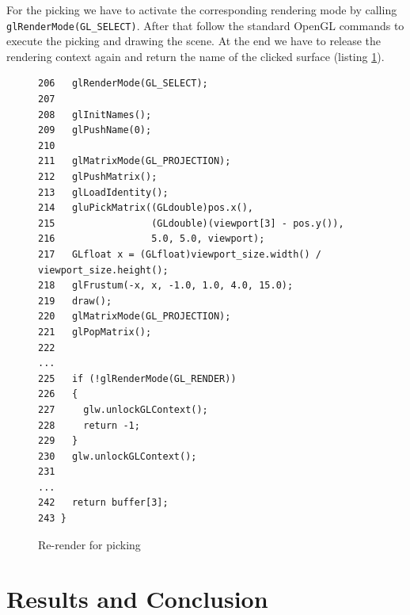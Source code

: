 \documentclass[jou,noapacite]{apa}
\renewcommand{\figurename}{Listing}
\begin{document}
For the picking we have to activate the corresponding rendering mode by
calling \lstinline|glRenderMode(GL_SELECT)|.
%
After that follow the standard OpenGL commands to execute the picking and
drawing the scene.
%
At the end we have to release the rendering context again and return the name
of the clicked surface (listing \ref{lst:picking}).
%
\begin{figure}[h]
\begin{lstlisting}[basicstyle=\scriptsize]
206   glRenderMode(GL_SELECT);
207
208   glInitNames();
209   glPushName(0);
210
211   glMatrixMode(GL_PROJECTION);
212   glPushMatrix();
213   glLoadIdentity();
214   gluPickMatrix((GLdouble)pos.x(),
215                 (GLdouble)(viewport[3] - pos.y()),
216                 5.0, 5.0, viewport);
217   GLfloat x = (GLfloat)viewport_size.width() /               viewport_size.height();
218   glFrustum(-x, x, -1.0, 1.0, 4.0, 15.0);
219   draw();
220   glMatrixMode(GL_PROJECTION);
221   glPopMatrix();
222
...
225   if (!glRenderMode(GL_RENDER))
226   {
227     glw.unlockGLContext();
228     return -1;
229   }
230   glw.unlockGLContext();
231
...
242   return buffer[3];
243 }
\end{lstlisting}
\caption{Re-render for picking}
\label{lst:picking}
\end{figure}

\section{Results and Conclusion}

\renewcommand{\figurename}{Figure}
\setcounter{figure}{0}
\end{document}
